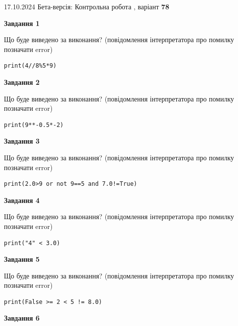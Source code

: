 \documentclass[12pt, ukrainian]{article}
\begin{document}
{\Large{17.10.2024 Бета-версія: Контрольна робота , варіант  \No \textbf { 78 }\par}}
{
\begin {large}
{\begin {center}\textbf{Завдання 1}\end {center}}

Що буде виведено за виконання? (повідомлення інтерпретатора про помилку позначати error)\par
\begin{verbatim}
print(4//8%5*9)
\end{verbatim}

{\begin {center}\textbf{Завдання 2}\end {center}}

Що буде виведено за виконання? (повідомлення інтерпретатора про помилку позначати error)\par
\begin{verbatim}
print(9**-0.5*-2)
\end{verbatim}

{\begin {center}\textbf{Завдання 3}\end {center}}

Що буде виведено за виконання? (повідомлення інтерпретатора про помилку позначати error)\par
\begin{verbatim}
print(2.0>9 or not 9==5 and 7.0!=True)
\end{verbatim}

{\begin {center}\textbf{Завдання 4}\end {center}}

Що буде виведено за виконання? (повідомлення інтерпретатора про помилку позначати error)\par
\begin{verbatim}
print("4" < 3.0)
\end{verbatim}

{\begin {center}\textbf{Завдання 5}\end {center}}

Що буде виведено за виконання? (повідомлення інтерпретатора про помилку позначати error)\par
\begin{verbatim}
print(False >= 2 < 5 != 8.0)
\end{verbatim}

{\begin {center}\textbf{Завдання 6}\end {center}}


\end{large}}
\end{document}
